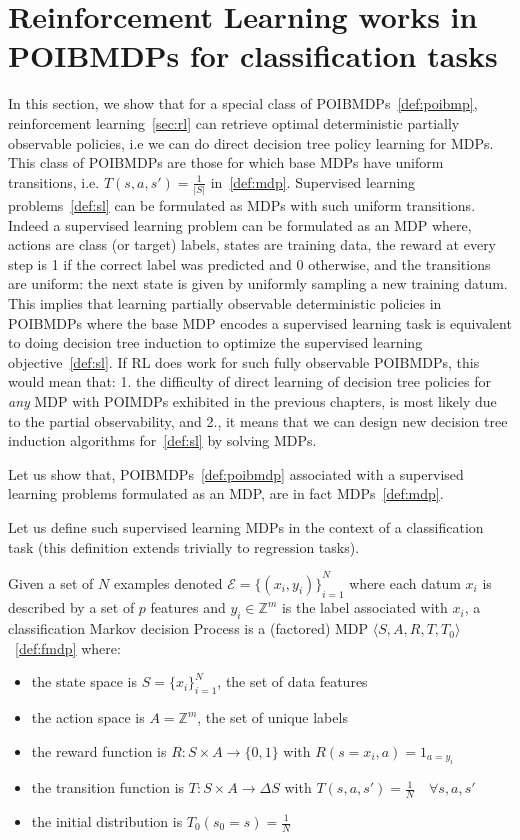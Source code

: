 \chapter{Reinforcement Learning works in POIBMDPs for classification tasks}\label{sec:pomdp-classif}
In this section, we show that for a special class of POIBMDPs~\ref{def:poibmp}, reinforcement learning~\ref{sec:rl} can retrieve optimal deterministic partially observable policies, i.e we can do direct decision tree policy learning for MDPs.
This class of POIBMDPs are those for which base MDPs have uniform transitions, i.e. $T(s, a, s') = \frac{1}{|S|}$ in~\ref{def:mdp}.
Supervised learning problems~\ref{def:sl} can be formulated as MDPs with such uniform transitions.
Indeed a supervised learning problem can be formulated as an MDP where, actions are class (or target) labels, states are training data, the reward at every step is 1 if the correct label was predicted and 0 otherwise, and the transitions are uniform: the next state is given by uniformly sampling a new training datum. 
This implies that learning partially observable deterministic policies in POIBMDPs where the base MDP encodes a supervised learning task is equivalent to doing decision tree induction to optimize the supervised learning objective~\ref{def:sl}.
If RL does work for such fully observable POIBMDPs, this would mean that: 1. the difficulty of direct learning of decision tree policies for \textit{any} MDP with POIMDPs exhibited in the previous chapters, is most likely due to the partial observability, and 2., it means that we can design new decision tree induction algorithms for~\ref{def:sl} by solving MDPs.

Let us show that, POIBMDPs~\ref{def:poibmdp} associated with a supervised learning problems formulated as an MDP, are in fact MDPs~\ref{def:mdp}.

Let us define such supervised learning MDPs in the context of a classification task (this definition extends trivially to regression tasks).
\begin{definition}\label{def:cmdp}
    Given a set of $N$ examples denoted $\mathcal{E} = {\{(x_i, y_i)\}}_{i=1}^N$ where each datum $x_i$ is described by a set of $p$ features and $y_i \in \mathbb{Z}^m$ is the label associated with $x_i$, a classification Markov decision Process is a (factored) MDP $\langle S, A, R, T, T_0 \rangle$~\ref{def:fmdp} where:
    \begin{itemize}
        \item the state space is $S={\{x_i\}}_{i=1}^N$, the set of data features
        \item the action space is $A=\mathbb{Z}^m$, the set of unique labels
        \item the reward function is $R:S\times A \rightarrow \{0, 1\}$ with $R(s=x_i, a) = 1_{a=y_i}$
        \item the transition function is $T:S\times A \rightarrow \Delta S$ with $T(s, a, s') = \frac{1}{N} \quad \forall s, a, s'$
        \item the initial distribution is $T_0(s_0 = s) = \frac{1}{N}$
    \end{itemize}
\end{definition}

